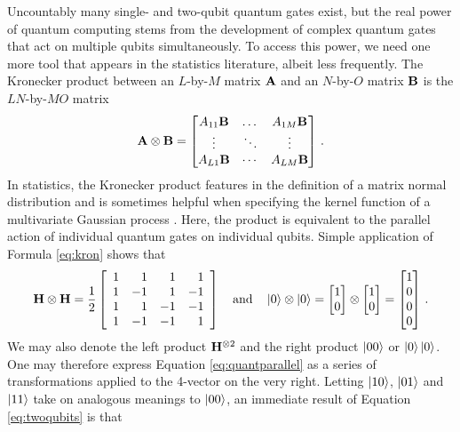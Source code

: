 \documentclass[12pt]{article} %
\begin{document}
Uncountably many single- and two-qubit quantum gates exist, but the real power of quantum computing stems from the development of complex quantum gates that act on multiple qubits simultaneously.   To access this power, we need one more tool that appears in the statistics literature, albeit less frequently.  The Kronecker product between an $L$-by-$M$ matrix $\mathbf{A}$ and an $N$-by-$O$ matrix $\mathbf{B}$ is the $LN$-by-$MO$ matrix
\begin{align}\label{eq:kron}
\mathbf{A} \otimes \mathbf{B} = \begin{bmatrix}
A_{11} \mathbf{B} & \dots & A_{1M} \mathbf{B} \\
\vdots & \ddots & \vdots \\
A_{L1}\mathbf{B} & \cdots & A_{LM}  \mathbf{B}
\end{bmatrix} \, .
\end{align} 
In statistics, the Kronecker product features in the definition of a matrix normal distribution and is sometimes helpful when specifying the kernel function of a multivariate Gaussian process \citep{werner2008estimation}. Here, the product is equivalent to the parallel action of individual quantum gates on individual qubits.  Simple application of Formula \eqref{eq:kron} shows that
\begin{align}\label{eq:twoqubits}
\mathbf{H} \otimes \mathbf{H} = \frac{1}{2} \left[\begin{array}{rrrr}
1 & 1 & 1 & 1 \\
1 &  -1& 1 & -1 \\
1 & 1 & -1 & -1 \\
1 & -1 & -1 & 1
\end{array}\right] \quad \mbox{and} \quad \ket{0}\otimes\ket{0}=\begin{bmatrix}
1 \\ 0
\end{bmatrix} \otimes \begin{bmatrix}
1 \\ 0
\end{bmatrix} = \begin{bmatrix}
1 \\ 0 \\ 0 \\ 0
\end{bmatrix} \, .
\end{align} 
We may also denote the left product $\mathbf{H}^{\otimes2}$ and the right product $\ket{00}$ or $\ket{0}\ket{0}$. One may therefore express Equation \eqref{eq:quantparallel} as a series of transformations applied to the 4-vector on the very right. Letting $\ket{10}$, $\ket{01}$ and $\ket{11}$ take on analogous meanings to $\ket{00}$, an immediate result of Equation \eqref{eq:twoqubits} is that
\end{document}

